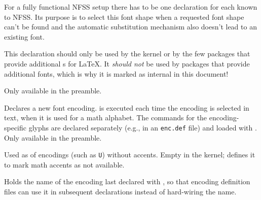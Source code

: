 \documentclass{l3in2edoc}
\begin{document}
\begin{function}[int]
  {
    \DeclareErrorFont
  }
  \begin{syntax}
         
  \end{syntax}
  For a fully functional NFSS setup there has to be one
   declaration for each  known to
  NFSS. Its purpose is to select this font shape when a requested font
  shape can't be found and the automatic substitution
  mechanism also doesn't lead to an existing font.

  This declaration should only be used by the kernel or by the few
  packages that provide additional s for \LaTeX. It
  \emph{should not} be used by packages that provide additional fonts,
  which is why it is marked as internal in this document!

  Only available in the preamble.
\end{function}



\begin{function}[user]
  {
    \DeclareFontEncoding
  }
  \begin{syntax}
       
  \end{syntax}
  Declares a new font encoding.  is executed each
  time the encoding is selected in text,  when it
  is used for a math alphabet. The commands for the encoding-specific
  glyphs are declared separately (e.g., in an \texttt{enc.def}
  file) and loaded with . Only available in the preamble.
\end{function}



\begin{function}[int]
  {
    \noaccents@
  }
  Used as  of encodings (such as \texttt{U})
  without accents. Empty in the kernel;  defines it to
  mark math accents as not available.
\end{function}





\begin{function}[user]
  {
    \LastDeclaredEncoding
  }
  \begin{syntax}
  \end{syntax}
  Holds the name of the encoding last declared with
  , so that encoding definition files can use
  it in subsequent declarations instead of hard-wiring the name.
\end{function}
\end{document}
